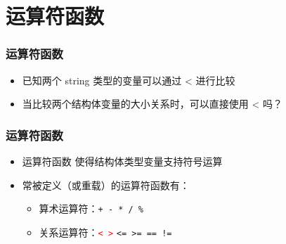 \section{运算符函数}

\begin{frame}[fragile]
    \frametitle{运算符函数}

    \begin{itemize}
        \item <1-> 已知两个 string 类型的变量可以通过 < 进行比较
        
        

        \item <2-> 当比较两个结构体变量的大小关系时，可以直接使用 < 吗？
        
        

    \end{itemize}

\end{frame}

\begin{frame}[fragile]
    \frametitle{运算符函数}

    \begin{itemize}
        \item <1-> 运算符函数 使得结构体类型变量支持符号运算

        \item <2-> 常被定义（或重载）的运算符函数有：
        
        \begin{itemize}
            \item 算术运算符：\lstinline|+ - * / %|
            \item 关系运算符：\textcolor{red}{\lstinline|< >|} \lstinline|<= >= == !=|
        \end{itemize}

    \end{itemize}

\end{frame}

